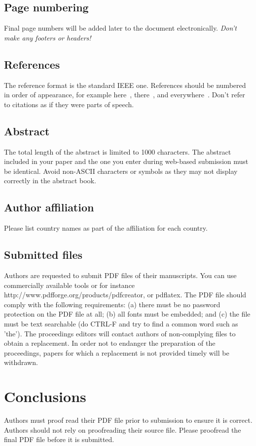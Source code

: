 \documentclass[a4paper]{article}
\begin{document}
\subsection{Page numbering}
Final page numbers will be added later to the document electronically. 
{\em Don't make any footers or headers!}


\subsection{References}
The reference format is the standard IEEE one.
References should be numbered in order of appearance, 
for example here~\cite{ES1}, there~\cite{ES2}, and everywhere~\cite{ES3}.
Don't refer to citations as if they were parts of speech.


\subsection{Abstract}
The total length of the abstract is limited to 1000 characters.
The abstract included in your paper and the one you enter during web-based submission must be identical.
Avoid non-ASCII characters or symbols as they may not display correctly in the abstract book.


\subsection{Author affiliation}
Please list country names as part of the affiliation for each country.


\subsection{Submitted files}
Authors are requested to submit PDF files of their manuscripts.
You can use commercially available tools or for instance http://www.pdfforge.org/products/pdfcreator, or pdflatex.
The PDF file should comply with the following requirements:
(a) there must be no password protection on the PDF file at all;
(b) all fonts must be embedded; and
(c) the file must be text searchable (do CTRL-F and try to find a common word such as 'the').
The proceedings editors will contact authors of non-complying files to obtain a replacement.
In order not to endanger the preparation of the proceedings, papers for which a replacement is not provided timely will be withdrawn.


\section{Conclusions}
Authors must proof read their PDF file prior to submission to ensure it is correct.
Authors should not rely on proofreading their source file.
Please proofread the final PDF file before it is submitted.
\end{document}
